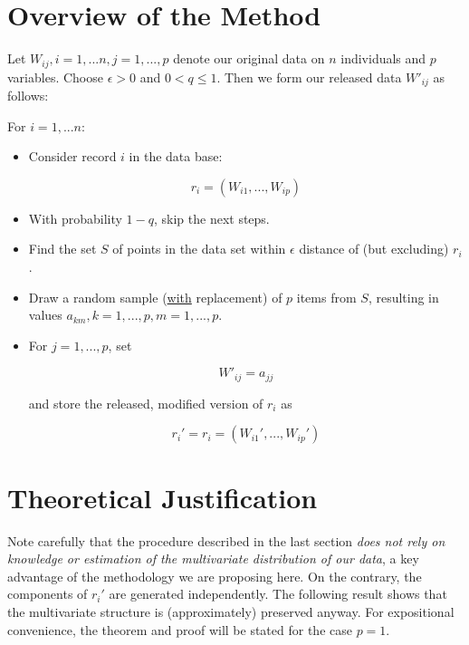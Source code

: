 \documentclass[11pt]{article}
\begin{document}
\section{Overview of the Method}
\label{overview}

Let $W_{ij}, i = 1,...n, j = 1,...,p$ denote our original data on $n$
individuals and $p$ variables.  Choose $\epsilon > 0$ and $0 < q \leq
1$.  Then we form our released data $W'_{ij}$ as follows:

For $i = 1,...n$:

\begin{itemize}

\item Consider record $i$ in the data base:

\begin{equation}
r_i = (W_{i1},...,W_{ip})
\end{equation}

\item With probability $1-q$, skip the next steps.

\item Find the set $S$ of points in the data set within $\epsilon$
distance of (but excluding) $r_i$.

\item Draw a random sample (\underline{with} replacement) of $p$ items
from $S$, resulting in values $a_{km}, k = 1,...,p, m = 1,...,p$.

\item For $j = 1,...,p$, set 

\begin{equation}
W'_{ij} = a_{jj}
\end{equation}

and store the released, modified version of $r_i$ as

\begin{equation}
r_i' = 
r_i = (W_{i1}',...,W_{ip}')
\end{equation}

\end{itemize}

\section{Theoretical Justification}

Note carefully that the procedure described in the last section {\it
does not rely on knowledge or estimation of the multivariate
distribution of our data}, a key advantage of the methodology we are
proposing here.  On the contrary, the components of $r_i'$ are generated
independently.  The following result shows that the multivariate
structure is (approximately) preserved anyway.  For expositional
convenience, the theorem and proof will be stated for the case $p = 1$.
\end{document}
